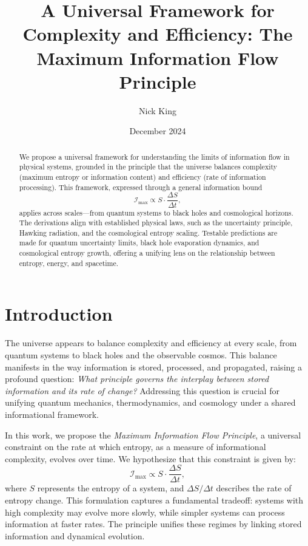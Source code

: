 \documentclass[12pt]{article}
\title{A Universal Framework for Complexity and Efficiency: The Maximum Information Flow Principle}
\author{Nick King}
\date{December 2024}
\begin{document}
\maketitle

\begin{abstract}
We propose a universal framework for understanding the limits of information flow in physical systems, grounded in the principle that the universe balances complexity (maximum entropy or information content) and efficiency (rate of information processing). This framework, expressed through a general information bound 
\[
\mathcal{I}_{\text{max}} \propto S \cdot \frac{\Delta S}{\Delta t},
\]
applies across scales—from quantum systems to black holes and cosmological horizons. The derivations align with established physical laws, such as the uncertainty principle, Hawking radiation, and the cosmological entropy scaling. Testable predictions are made for quantum uncertainty limits, black hole evaporation dynamics, and cosmological entropy growth, offering a unifying lens on the relationship between entropy, energy, and spacetime.
\end{abstract}

\section{Introduction}

The universe appears to balance complexity and efficiency at every scale, from quantum systems to black holes and the observable cosmos. This balance manifests in the way information is stored, processed, and propagated, raising a profound question: \textit{What principle governs the interplay between stored information and its rate of change?} Addressing this question is crucial for unifying quantum mechanics, thermodynamics, and cosmology under a shared informational framework.

In this work, we propose the \textit{Maximum Information Flow Principle}, a universal constraint on the rate at which entropy, as a measure of informational complexity, evolves over time. We hypothesize that this constraint is given by:
\[
\mathcal{I}_{\text{max}} \propto S \cdot \frac{\Delta S}{\Delta t},
\]
where \( S \) represents the entropy of a system, and \( \Delta S / \Delta t \) describes the rate of entropy change. This formulation captures a fundamental tradeoff: systems with high complexity may evolve more slowly, while simpler systems can process information at faster rates. The principle unifies these regimes by linking stored information and dynamical evolution.
\end{document}
